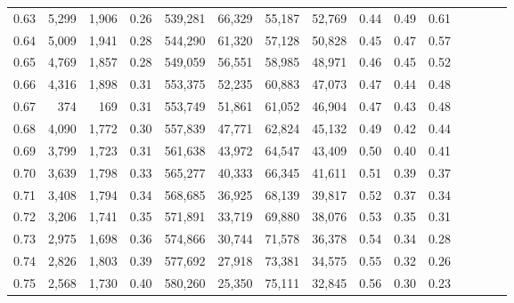 \begin{tabular}{rrrcrrrrrrrrrrr}
0.63 &   5,299 &  1,906 &                                       0.26 &  539,281 &   66,329 &   55,187 &   52,769 &  0.44 &  0.49 &                         0.61 \\
0.64 &   5,009 &  1,941 &                                       0.28 &  544,290 &   61,320 &   57,128 &   50,828 &  0.45 &  0.47 &                         0.57 \\
0.65 &   4,769 &  1,857 &                                       0.28 &  549,059 &   56,551 &   58,985 &   48,971 &  0.46 &  0.45 &                         0.52 \\
0.66 &   4,316 &  1,898 &                                       0.31 &  553,375 &   52,235 &   60,883 &   47,073 &  0.47 &  0.44 &                         0.48 \\
0.67 &     374 &    169 &                                       0.31 &  553,749 &   51,861 &   61,052 &   46,904 &  0.47 &  0.43 &                         0.48 \\
0.68 &   4,090 &  1,772 &                                       0.30 &  557,839 &   47,771 &   62,824 &   45,132 &  0.49 &  0.42 &                         0.44 \\
0.69 &   3,799 &  1,723 &                                       0.31 &  561,638 &   43,972 &   64,547 &   43,409 &  0.50 &  0.40 &                         0.41 \\
0.70 &   3,639 &  1,798 &                                       0.33 &  565,277 &   40,333 &   66,345 &   41,611 &  0.51 &  0.39 &                         0.37 \\
0.71 &   3,408 &  1,794 &                                       0.34 &  568,685 &   36,925 &   68,139 &   39,817 &  0.52 &  0.37 &                         0.34 \\
0.72 &   3,206 &  1,741 &                                       0.35 &  571,891 &   33,719 &   69,880 &   38,076 &  0.53 &  0.35 &                         0.31 \\
0.73 &   2,975 &  1,698 &                                       0.36 &  574,866 &   30,744 &   71,578 &   36,378 &  0.54 &  0.34 &                         0.28 \\
0.74 &   2,826 &  1,803 &                                       0.39 &  577,692 &   27,918 &   73,381 &   34,575 &  0.55 &  0.32 &                         0.26 \\
0.75 &   2,568 &  1,730 &                                       0.40 &  580,260 &   25,350 &   75,111 &   32,845 &  0.56 &  0.30 &                         0.23 \\

\end{tabular}
